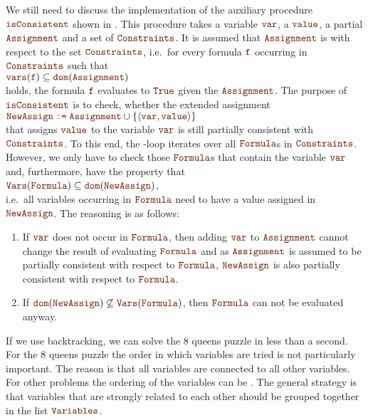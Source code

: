 We still need to discuss the implementation of the auxiliary procedure $\mytt{isConsistent}$
shown in .  This procedure takes a variable $\mytt{var}$, a $\mytt{value}$, a partial 
$\mytt{Assignment}$ and a set of $\mytt{Constraints}$.  It is assumed that $\mytt{Assignment}$ is
 with respect to the set $\mytt{Constraints}$, i.e.~for every formula $\mytt{f}$
occurring in $\mytt{Constraints}$ such that
\\[0.2cm]
\hspace*{1.3cm}
$\mytt{vars}(\mytt{f}) \subseteq \mytt{dom}(\mytt{Assignment})$
\\[0.2cm]
holds, the formula $\mytt{f}$ evaluates to $\mytt{True}$ given the $\mytt{Assignment}$.  The purpose of
$\mytt{isConsistent}$ is to check, whether the extended assignment
\\[0.2cm]
\hspace*{1.3cm}
$\mytt{NewAssign} \;\mytt{:=}\;\mytt{Assignment} \cup \{ \pair(\mytt{var}, \mytt{value}) \}$
\\[0.2cm]
that assigns $\mytt{value}$ to the variable $\mytt{var}$ is still partially consistent with $\mytt{Constraints}$. 
To this end, the -loop iterates over all $\mytt{Formula}$s in $\mytt{Constraints}$. 
However, we only have to check those $\mytt{Formula}$s that contain the variable $\mytt{var}$ and,
furthermore, have the property that
\\[0.2cm]
\hspace*{1.3cm}
$\mytt{Vars}(\mytt{Formula}) \subseteq \mytt{dom}(\mytt{NewAssign})$,
\\[0.2cm]
i.e.~all variables occurring in $\mytt{Formula}$ need to have a value assigned in
$\mytt{NewAssign}$.  The reasoning is as follows:
\begin{enumerate}
\item If $\mytt{var}$ does not occur in $\mytt{Formula}$, then adding $\mytt{var}$ to
      $\mytt{Assignment}$ cannot change the result of evaluating $\mytt{Formula}$ and as
      $\mytt{Assignment}$ is assumed to be partially consistent with respect to $\mytt{Formula}$, 
      $\mytt{NewAssign}$ is also partially consistent with respect to $\mytt{Formula}$.
\item If $\mytt{dom}(\mytt{NewAssign}) \not\subseteq \mytt{Vars}(\mytt{Formula})$, then $\mytt{Formula}$ can not be evaluated anyway. 
\end{enumerate}
If we use backtracking, we can solve the 8 queens puzzle in less than a second.
For the 8 queens puzzle the order in which variables are tried is not particularly important.  The reason
is that all variables are connected to all other variables.  For other problems the ordering of the variables
can be .  The general strategy is that variables that are strongly related to each other should
be grouped together in the list $\mytt{Variables}$.


